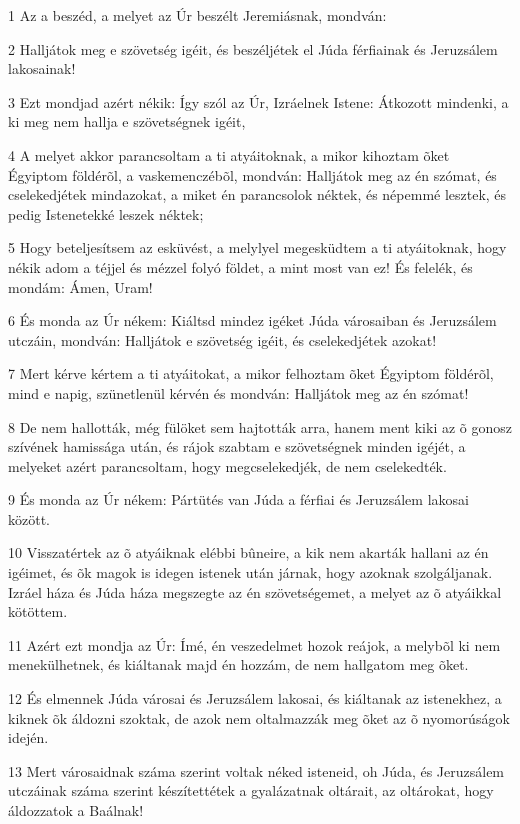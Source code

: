 \par 1 Az a beszéd, a melyet az Úr beszélt Jeremiásnak, mondván:
\par 2 Halljátok meg e szövetség igéit, és beszéljétek el Júda férfiainak és Jeruzsálem lakosainak!
\par 3 Ezt mondjad azért nékik: Így szól az Úr, Izráelnek Istene: Átkozott mindenki, a ki meg nem hallja e szövetségnek igéit,
\par 4 A melyet akkor parancsoltam a ti atyáitoknak, a mikor kihoztam õket Égyiptom földérõl, a vaskemenczébõl, mondván: Halljátok meg az én szómat, és cselekedjétek mindazokat, a miket én parancsolok néktek, és népemmé lesztek, és pedig Istenetekké leszek néktek;
\par 5 Hogy beteljesítsem az esküvést, a melylyel megesküdtem a ti atyáitoknak, hogy nékik adom a téjjel és mézzel folyó földet, a mint most van ez! És felelék, és mondám: Ámen, Uram!
\par 6 És monda az Úr nékem: Kiáltsd mindez igéket Júda városaiban és Jeruzsálem utczáin, mondván: Halljátok e szövetség igéit, és cselekedjétek azokat!
\par 7 Mert kérve kértem a ti atyáitokat, a mikor felhoztam õket Égyiptom földérõl, mind e napig, szünetlenül kérvén és mondván: Halljátok meg az én szómat!
\par 8 De nem hallották, még fülöket sem hajtották arra, hanem ment kiki az õ gonosz szívének hamissága után, és rájok szabtam e szövetségnek minden igéjét, a melyeket azért parancsoltam, hogy megcselekedjék, de nem cselekedték.
\par 9 És monda az Úr nékem: Pártütés van Júda a férfiai és Jeruzsálem lakosai között.
\par 10 Visszatértek az õ atyáiknak elébbi bûneire, a kik nem akarták hallani az én igéimet, és õk magok is idegen istenek után járnak, hogy azoknak szolgáljanak. Izráel háza és Júda háza megszegte az én szövetségemet, a melyet az õ atyáikkal kötöttem.
\par 11 Azért ezt mondja az Úr: Ímé, én veszedelmet hozok reájok, a melybõl ki nem menekülhetnek, és kiáltanak majd én hozzám, de nem hallgatom meg õket.
\par 12 És elmennek Júda városai és Jeruzsálem lakosai, és kiáltanak az istenekhez, a kiknek õk áldozni szoktak, de azok nem oltalmazzák meg õket az õ nyomorúságok idején.
\par 13 Mert városaidnak száma szerint voltak néked isteneid, oh Júda, és Jeruzsálem utczáinak száma szerint készítettétek a gyalázatnak oltárait, az oltárokat, hogy áldozzatok a Baálnak!
